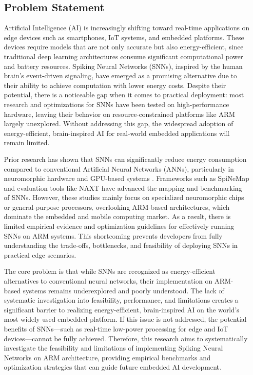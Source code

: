 \documentclass[a4paper,12pt]{article}
\begin{document}
	\subsection{Problem Statement}
	Artificial Intelligence (AI) is increasingly shifting toward real-time applications on edge devices such as smartphones, IoT systems, and embedded platforms. These devices require models that are not only accurate but also energy-efficient, since traditional deep learning architectures consume significant computational power and battery resources. Spiking Neural Networks (SNNs), inspired by the human brain’s event-driven signaling, have emerged as a promising alternative due to their ability to achieve computation with lower energy costs. Despite their potential, there is a noticeable gap when it comes to practical deployment: most research and optimizations for SNNs have been tested on high-performance hardware, leaving their behavior on resource-constrained platforms like ARM largely unexplored. Without addressing this gap, the widespread adoption of energy-efficient, brain-inspired AI for real-world embedded applications will remain limited.
	
	Prior research has shown that SNNs can significantly reduce energy consumption compared to conventional Artificial Neural Networks (ANNs), particularly in neuromorphic hardware and GPU-based systems \citep{Bouvier2019, Bu2022}. Frameworks such as SpiNeMap \citep{Balaji2019} and evaluation tools like NAXT \citep{Abderrahmane2020} have advanced the mapping and benchmarking of SNNs. However, these studies mainly focus on specialized neuromorphic chips or general-purpose processors, overlooking ARM-based architectures, which dominate the embedded and mobile computing market. As a result, there is limited empirical evidence and optimization guidelines for effectively running SNNs on ARM systems. This shortcoming prevents developers from fully understanding the trade-offs, bottlenecks, and feasibility of deploying SNNs in practical edge scenarios.
	
	The core problem is that while SNNs are recognized as energy-efficient alternatives to conventional neural networks, their implementation on ARM-based systems remains underexplored and poorly understood. The lack of systematic investigation into feasibility, performance, and limitations creates a significant barrier to realizing energy-efficient, brain-inspired AI on the world’s most widely used embedded platform. If this issue is not addressed, the potential benefits of SNNs—such as real-time low-power processing for edge and IoT devices—cannot be fully achieved. Therefore, this research aims to systematically investigate the feasibility and limitations of implementing Spiking Neural Networks on ARM architecture, providing empirical benchmarks and optimization strategies that can guide future embedded AI development.
	
\end{document}
